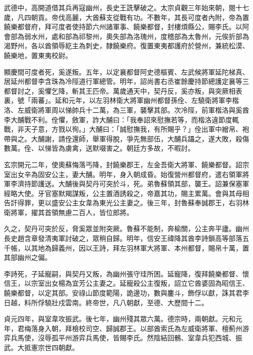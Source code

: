 \begin{pinyinscope}
 武德中，高開道借其兵再寇幽州，長史王詵擊破之。太宗貞觀三年始來朝，閱十七歲，凡四朝貢。帝伐高麗，大酋蘇支從戰有功。不數年，其長可度者內附，帝為置饒樂都督府，拜可度者使持節六州諸軍事、饒樂都督，封樓煩縣公，賜李氏。以阿會部為弱水州，處和部為祁黎州，奧失部為洛瑰州，度稽部為太魯州，元俟折部為渴野州，各以酋領辱紇主為刺史，隸饒樂府。復置東夷都護府於營州，兼統松漠、饒樂地，置東夷校尉。



 顯慶間可度者死，奚遂叛。五年，以定襄都督阿史德樞賓、左武候將軍延陀梯真、居延州都督李含珠為冷陘道行軍總管。明年，詔尚書右丞崔餘慶持節總護定襄等三都督討之，奚懼乞降，斬其王匹帝。萬歲通天中，契丹反，奚亦叛，與突厥相表裏，號「兩蕃」。延和元年，以左羽林衛大將軍幽州都督孫佺、左驍衛將軍李楷洛、左威衛將軍周以悌帥兵十二萬，為三軍，襲擊其部。次冷陘，前軍楷洛與奚酋李大酺戰不利。佺懼，斂軍，詐大酺曰：「我奉詔來慰撫若等，而楷洛違節度輒戰，非天子意，方戮以徇。」大酺曰：「誠慰撫我，有所賜乎？」佺出軍中繒帛、袍帶與之。大酺謝，請佺還師，舉軍得脫，爭先無部伍，大酺兵躡之，遂大敗，殺傷數萬。佺、以悌皆為虜禽，送默啜害之。朝廷方多故，不暇討。



 玄宗開元二年，使奧蘇悔落丐降，封饒樂郡王，左金吾衛大將軍、饒樂都督。詔宗室出女辛為固安公主，妻大酺。明年，身入朝成昏。始復營州都督府，遣右領軍將軍李濟持節護送。大酺後與契丹可突於斗，死。弟魯蘇領其部，襲王。詔兼保塞軍經略大使。牙官塞默羯謀叛，公主置酒誘殺之，帝嘉其功，賜主累萬。會與其母相告訐得罪，更以盛安公主女韋為東光公主妻之。後三年，封魯蘇奉誠郡王，右羽林衛將軍，擢其首領無慮二百人，皆位郎將。



 久之，契丹可突於反，脅奚眾並附突厥。魯蘇不能制，奔榆關，公主奔平廬。幽州長史趙含章發清夷軍討破之，眾稍自歸。明年，信安王禕降其酋李詩鎖高等部落五千帳，以其地為歸義州，因以王詩，拜左羽林軍大將軍、本州都督，賜帛十萬，置其部幽州之偏。



 李詩死，子延寵嗣，與契丹又叛，為幽州張守珪所困。延寵降，復拜饒樂都督、懷信王，以宗室出女楊為宜芳公主妻之。延寵殺公主復叛，詔立它酋婆固為昭信王、饒樂都督，以定其部。安祿山節度範陽，詭邊功，數與鏖斗，飾俘以獻，誅其君李日越，料所俘驍壯戍雲南。終帝世，凡八朝獻，至德、大歷間十二。



 貞元四年，與室韋攻振武。後七年，幽州殘其眾六萬。德宗時，兩朝獻。元和元年，君梅落身入朝，拜檢校司空、歸誠郡王。以部酋索氏為左威衛將軍、檀薊州游弈兵馬使，沒辱孤平州游弈兵馬使，皆賜李氏。然陰結回鶻、室韋兵犯西城、振武。大抵憲宗世四朝獻。




\end{pinyinscope}
